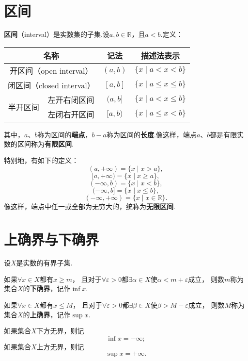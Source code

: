 \section{区间}
\begin{definition}
\textbf{区间}（interval）是实数集的子集.设\(a,b\in\mathbb{R}\)，且\(a<b\).定义：
\begin{center}
\begin{tabular}{|c|c|c|c|} \hline
\multicolumn{2}{|c|}{名称} & 记法 & 描述法表示 \\ \hline
\multicolumn{2}{|c|}{开区间（open interval）} & \((a,b)\) & \(\{ x \mid a < x < b \}\) \\ \hline
\multicolumn{2}{|c|}{闭区间（closed interval）} & \([a,b]\) & \(\{ x \mid a \leqslant x \leqslant b \}\) \\ \hline
\multirow{2}{*}{半开区间} & 左开右闭区间 & \((a,b]\) & \(\{ x \mid a < x \leqslant b \}\) \\ \cline{2-4}
& 左闭右开区间 & \([a,b)\) & \(\{ x \mid a \leqslant x < b \}\) \\ \hline
\end{tabular}
\end{center}
其中，\(a\)、\(b\)称为区间的\textbf{端点}，\(b-a\)称为区间的\textbf{长度}.像这样，端点\(a\)、\(b\)都是有限实数的区间称为\textbf{有限区间}.

特别地，有如下的定义：
\[ (a,+\infty) = \{ x \mid x > a\}, \]
\[ [a,+\infty) = \{ x \mid x \geqslant a\}, \]
\[ (-\infty,b) = \{ x \mid x < b\}, \]
\[ (-\infty,b] = \{ x \mid x \leqslant b\}, \]
\[ (-\infty,+\infty) = \{ x \mid x \in \mathbb{R} \}. \]
像这样，端点中任一或全部为无穷大的，统称为\textbf{无限区间}.
\end{definition}

\section{上确界与下确界}
\begin{definition}
设\(X\)是实数的有界子集.

如果\(\forall x \in X\)都有\(x \geqslant m\)，%
且对于\(\forall \varepsilon > 0\)都\(\exists \alpha \in X\)使\(\alpha < m + \varepsilon\)成立，%
则数\(m\)称为集合\(X\)的\textbf{下确界}，记作\(\inf{x}\).

如果\(\forall x \in X\)都有\(x \leqslant M\)，%
且对于\(\forall \varepsilon > 0\)都\(\exists \beta \in X\)使\(\beta > M - \varepsilon\)成立，%
则数\(M\)称为集合\(X\)的\textbf{上确界}，记作\(\sup{x}\).

如果集合\(X\)下方无界，则记\[
\inf{x} = -\infty;
\]如果集合\(X\)上方无界，则记\[
\sup{x} = +\infty.
\]
\end{definition}

